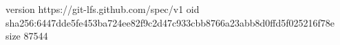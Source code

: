 version https://git-lfs.github.com/spec/v1
oid sha256:6447dde5fe453ba724ee82f9c2d47c933cbb8766a23abb8d0ffd5f025216f78e
size 87544
